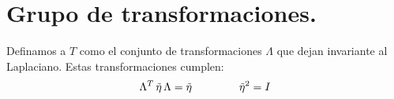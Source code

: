 \newpage
\section{Grupo de transformaciones.}

Definamos a $T$ como el conjunto de transformaciones $\Lambda$ que dejan invariante al Laplaciano. Estas transformaciones cumplen:
\begin{align}
\Lambda^{T} \, \tilde{\eta} \, \Lambda = \tilde{\eta} \hspace{1.5cm} \tilde{\eta}^{2} = I
\label{eq:ecuacion_10_032}
\end{align}
